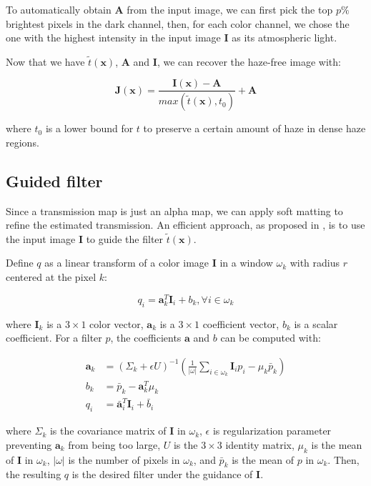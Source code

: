 \documentclass{article}
\begin{document}
To automatically obtain $\mathbf{A}$ from the input image, we can first pick the top $p\%$ brightest pixels in the dark channel, then, for each color channel, we chose the one with the highest intensity in the input image $\mathbf{I}$ as its atmospheric light.

Now that we have $\tilde{t}(\mathbf{x})$, $\mathbf{A}$ and $\mathbf{I}$, we can recover the haze-free image with:

$$
\mathbf{J}(\mathbf{x}) = \frac{\mathbf{I}(\mathbf{x}) - \mathbf{A}}{max(\tilde{t}(\mathbf{x}),t_0)} + \mathbf{A}
$$

where $t_0$ is a lower bound for $t$ to preserve a certain amount of haze in dense haze regions.

\subsection{Guided filter}

Since a transmission map is just an alpha map, we can apply soft matting to refine the estimated transmission. An efficient approach, as proposed in \cite{he2010guided}, is to use the input image $\mathbf{I}$ to guide the filter $\tilde{t}(\mathbf{x})$.

Define $q$ as a linear transform of a color image $\mathbf{I}$ in a window $\omega_k$ with radius $r$ centered at the pixel $k$:

$$
q_i = \mathbf{a}_k^T\mathbf{I}_i + b_k, \forall i \in \omega_k
$$

where $\mathbf{I}_k$ is a $3 \times 1$ color vector, $\mathbf{a}_k$ is a $3 \times 1$ coefficient vector, $b_k$ is a scalar coefficient. For a filter $p$, the coefficients $\mathbf{a}$ and $b$ can be computed with:

\begin{align*}
\mathbf{a}_k &= (\Sigma_k + \epsilon U)^{-1}(\frac{1}{|\omega|}\sum_{i \in \omega_k}\mathbf{I}_i p_i - \mu_k \bar{p}_k) \\
b_k &= \bar{p}_k - \mathbf{a}_k^T\mu_k \\
q_i &= \bar{\mathbf{a}}_i^T\mathbf{I}_i + \bar{b}_i
\end{align*}

where $\Sigma_k$ is the covariance matrix of $\mathbf{I}$ in $\omega_k$, $\epsilon$ is regularization parameter preventing $\mathbf{a}_k$ from being too large, $U$ is the $3 \times 3$ identity matrix, $\mu_k$ is the mean of $\mathbf{I}$ in $\omega_k$, $|\omega|$ is the number of pixels in $\omega_k$, and $\bar{p}_k$ is the mean of $p$ in $\omega_k$. Then, the resulting $q$ is the desired filter under the guidance of $\mathbf{I}$.
\end{document}
